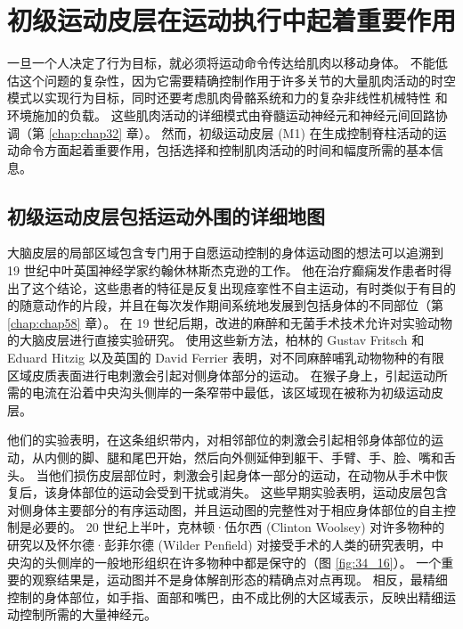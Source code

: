 \section{初级运动皮层在运动执行中起着重要作用}
一旦一个人决定了行为目标，就必须将运动命令传达给肌肉以移动身体。 不能低估这个问题的复杂性，因为它需要精确控制作用于许多关节的大量肌肉活动的时空模式以实现行为目标，同时还要考虑肌肉骨骼系统和力的复杂非线性机械特性 和环境施加的负载。 这些肌肉活动的详细模式由脊髓运动神经元和神经元间回路协调（第 \ref{chap:chap32} 章）。 然而，初级运动皮层 (M1) 在生成控制脊柱活动的运动命令方面起着重要作用，包括选择和控制肌肉活动的时间和幅度所需的基本信息。


\subsection{初级运动皮层包括运动外围的详细地图}
大脑皮层的局部区域包含专门用于自愿运动控制的身体运动图的想法可以追溯到 19 世纪中叶英国神经学家约翰休林斯杰克逊的工作。 他在治疗癫痫发作患者时得出了这个结论，这些患者的特征是反复出现痉挛性不自主运动，有时类似于有目的的随意动作的片段，并且在每次发作期间系统地发展到包括身体的不同部位（第 \ref{chap:chap58} 章）。 在 19 世纪后期，改进的麻醉和无菌手术技术允许对实验动物的大脑皮层进行直接实验研究。 使用这些新方法，柏林的 Gustav Fritsch 和 Eduard Hitzig 以及英国的 David Ferrier 表明，对不同麻醉哺乳动物物种的有限区域皮质表面进行电刺激会引起对侧身体部分的运动。 在猴子身上，引起运动所需的电流在沿着中央沟头侧岸的一条窄带中最低，该区域现在被称为初级运动皮层。

他们的实验表明，在这条组织带内，对相邻部位的刺激会引起相邻身体部位的运动，从内侧的脚、腿和尾巴开始，然后向外侧延伸到躯干、手臂、手、脸、嘴和舌头。 当他们损伤皮层部位时，刺激会引起身体一部分的运动，在动物从手术中恢复后，该身体部位的运动会受到干扰或消失。 这些早期实验表明，运动皮层包含对侧身体主要部分的有序运动图，并且运动图的完整性对于相应身体部位的自主控制是必要的。 
20 世纪上半叶，克林顿·伍尔西 (Clinton Woolsey) 对许多物种的研究以及怀尔德·彭菲尔德 (Wilder Penfield) 对接受手术的人类的研究表明，中央沟的头侧岸的一般地形组织在许多物种中都是保守的（图 \ref{fig:34_16}）。 
一个重要的观察结果是，运动图并不是身体解剖形态的精确点对点再现。 相反，最精细控制的身体部位，如手指、面部和嘴巴，由不成比例的大区域表示，反映出精细运动控制所需的大量神经元。

